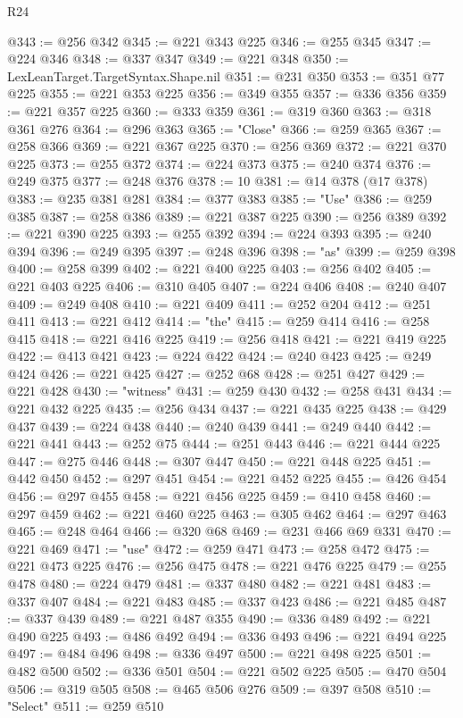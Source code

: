 \begin{lexlean}{R24}
\begin{coremodule}
@343 := @256 @342
@345 := @221 @343 @225
@346 := @255 @345
@347 := @224 @346
@348 := @337 @347
@349 := @221 @348
@350 := LexLeanTarget.TargetSyntax.Shape.nil
@351 := @231 @350
@353 := @351 @77 @225
@355 := @221 @353 @225
@356 := @349 @355
@357 := @336 @356
@359 := @221 @357 @225
@360 := @333 @359
@361 := @319 @360
@363 := @318 @361 @276
@364 := @296 @363
@365 := "Close"
@366 := @259 @365
@367 := @258 @366
@369 := @221 @367 @225
@370 := @256 @369
@372 := @221 @370 @225
@373 := @255 @372
@374 := @224 @373
@375 := @240 @374
@376 := @249 @375
@377 := @248 @376
@378 := 10
@381 := @14 @378 (@17 @378)
@383 := @235 @381 @281
@384 := @377 @383
@385 := "Use"
@386 := @259 @385
@387 := @258 @386
@389 := @221 @387 @225
@390 := @256 @389
@392 := @221 @390 @225
@393 := @255 @392
@394 := @224 @393
@395 := @240 @394
@396 := @249 @395
@397 := @248 @396
@398 := "as"
@399 := @259 @398
@400 := @258 @399
@402 := @221 @400 @225
@403 := @256 @402
@405 := @221 @403 @225
@406 := @310 @405
@407 := @224 @406
@408 := @240 @407
@409 := @249 @408
@410 := @221 @409
@411 := @252 @204
@412 := @251 @411
@413 := @221 @412
@414 := "the"
@415 := @259 @414
@416 := @258 @415
@418 := @221 @416 @225
@419 := @256 @418
@421 := @221 @419 @225
@422 := @413 @421
@423 := @224 @422
@424 := @240 @423
@425 := @249 @424
@426 := @221 @425
@427 := @252 @68
@428 := @251 @427
@429 := @221 @428
@430 := "witness"
@431 := @259 @430
@432 := @258 @431
@434 := @221 @432 @225
@435 := @256 @434
@437 := @221 @435 @225
@438 := @429 @437
@439 := @224 @438
@440 := @240 @439
@441 := @249 @440
@442 := @221 @441
@443 := @252 @75
@444 := @251 @443
@446 := @221 @444 @225
@447 := @275 @446
@448 := @307 @447
@450 := @221 @448 @225
@451 := @442 @450
@452 := @297 @451
@454 := @221 @452 @225
@455 := @426 @454
@456 := @297 @455
@458 := @221 @456 @225
@459 := @410 @458
@460 := @297 @459
@462 := @221 @460 @225
@463 := @305 @462
@464 := @297 @463
@465 := @248 @464
@466 := @320 @68
@469 := @231 @466 @69 @331
@470 := @221 @469
@471 := "use"
@472 := @259 @471
@473 := @258 @472
@475 := @221 @473 @225
@476 := @256 @475
@478 := @221 @476 @225
@479 := @255 @478
@480 := @224 @479
@481 := @337 @480
@482 := @221 @481
@483 := @337 @407
@484 := @221 @483
@485 := @337 @423
@486 := @221 @485
@487 := @337 @439
@489 := @221 @487 @355
@490 := @336 @489
@492 := @221 @490 @225
@493 := @486 @492
@494 := @336 @493
@496 := @221 @494 @225
@497 := @484 @496
@498 := @336 @497
@500 := @221 @498 @225
@501 := @482 @500
@502 := @336 @501
@504 := @221 @502 @225
@505 := @470 @504
@506 := @319 @505
@508 := @465 @506 @276
@509 := @397 @508
@510 := "Select"
@511 := @259 @510

\end{coremodule}
\end{lexlean}
